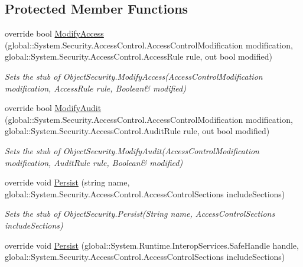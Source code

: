 \subsection*{Protected Member Functions}
\begin{DoxyCompactItemize}
\item 
override bool \hyperlink{class_system_1_1_security_1_1_access_control_1_1_fakes_1_1_stub_object_security_a65c1e75ccb98fa21ca19add6172dd8e0}{Modify\-Access} (global\-::\-System.\-Security.\-Access\-Control.\-Access\-Control\-Modification modification, global\-::\-System.\-Security.\-Access\-Control.\-Access\-Rule rule, out bool modified)
\begin{DoxyCompactList}\small\item\em Sets the stub of Object\-Security.\-Modify\-Access(Access\-Control\-Modification modification, Access\-Rule rule, Boolean\& modified)\end{DoxyCompactList}\item 
override bool \hyperlink{class_system_1_1_security_1_1_access_control_1_1_fakes_1_1_stub_object_security_a300dc94d6ba178f1e8058d37eeb81e05}{Modify\-Audit} (global\-::\-System.\-Security.\-Access\-Control.\-Access\-Control\-Modification modification, global\-::\-System.\-Security.\-Access\-Control.\-Audit\-Rule rule, out bool modified)
\begin{DoxyCompactList}\small\item\em Sets the stub of Object\-Security.\-Modify\-Audit(Access\-Control\-Modification modification, Audit\-Rule rule, Boolean\& modified)\end{DoxyCompactList}\item 
override void \hyperlink{class_system_1_1_security_1_1_access_control_1_1_fakes_1_1_stub_object_security_ae1160613b40555edca19a6d3ebe0ae39}{Persist} (string name, global\-::\-System.\-Security.\-Access\-Control.\-Access\-Control\-Sections include\-Sections)
\begin{DoxyCompactList}\small\item\em Sets the stub of Object\-Security.\-Persist(\-String name, Access\-Control\-Sections include\-Sections)\end{DoxyCompactList}\item 
override void \hyperlink{class_system_1_1_security_1_1_access_control_1_1_fakes_1_1_stub_object_security_a56a44f5798edd8927a1d665eef24a44c}{Persist} (global\-::\-System.\-Runtime.\-Interop\-Services.\-Safe\-Handle handle, global\-::\-System.\-Security.\-Access\-Control.\-Access\-Control\-Sections include\-Sections)

\end{DoxyCompactItemize}
